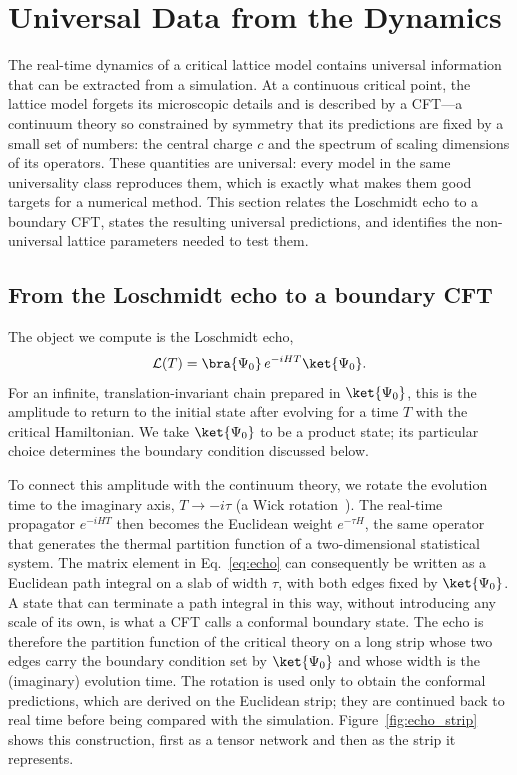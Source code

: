 \FloatBarrier
\section{Universal Data from the Dynamics}
\label{sec:cft}

The real-time dynamics of a critical lattice model contains universal information that can be extracted from a simulation. At a continuous critical point, the lattice model forgets its microscopic details and is described by a \ac{CFT}---a continuum theory so constrained by symmetry that its predictions are fixed by a small set of numbers: the central charge $c$ and the spectrum of scaling dimensions of its operators. These quantities are universal: every model in the same universality class reproduces them, which is exactly what makes them good targets for a numerical method. This section relates the Loschmidt echo to a boundary \ac{CFT}, states the resulting universal predictions, and identifies the non-universal lattice parameters needed to test them.

\subsection{From the Loschmidt echo to a boundary CFT}
\label{sec:cft:boundary}

The object we compute is the Loschmidt echo,
\begin{equation}
  \mathcal{L}(T) = \bra{\Psi_0}\, e^{-iHT} \ket{\Psi_0}.
  \label{eq:echo}
\end{equation}
For an infinite, translation-invariant chain prepared in $\ket{\Psi_0}$, this is the amplitude to return to the initial state after evolving for a time $T$ with the critical Hamiltonian. We take $\ket{\Psi_0}$ to be a product state; its particular choice determines the boundary condition discussed below.

To connect this amplitude with the continuum theory, we rotate the evolution time to the imaginary axis, $T\to-i\tau$ (a Wick rotation~\cite{wick1950}). The real-time propagator $e^{-iHT}$ then becomes the Euclidean weight $e^{-\tau H}$, the same operator that generates the thermal partition function of a two-dimensional statistical system. The matrix element in Eq.~\eqref{eq:echo} can consequently be written as a Euclidean path integral on a slab of width $\tau$, with both edges fixed by $\ket{\Psi_0}$. A state that can terminate a path integral in this way, without introducing any scale of its own, is what a \ac{CFT} calls a conformal boundary state. The echo is therefore the partition function of the critical theory on a long strip whose two edges carry the boundary condition set by $\ket{\Psi_0}$ and whose width is the (imaginary) evolution time. The rotation is used only to obtain the conformal predictions, which are derived on the Euclidean strip; they are continued back to real time before being compared with the simulation. Figure~\ref{fig:echo_strip} shows this construction, first as a tensor network and then as the strip it represents.

